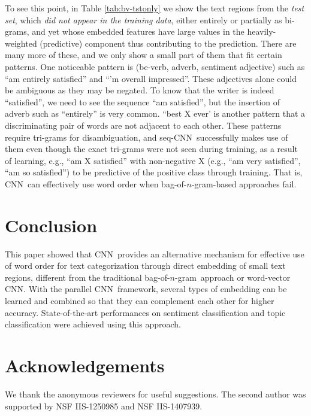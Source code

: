 \documentclass[11pt,letterpaper]{article}
\newcommand{\cnn}{CNN}
\newcommand{\scnn}{seq-CNN}
\newcommand{\bongram}{bag-of-$n$-gram}
\begin{document}
%
To see this point, in Table \ref{tab:bv-tstonly} we show the text regions from the {\em test set}, 
which {\em did not appear in the training data}, either entirely or partially as bi-grams, 
and yet whose embedded features have large values in the heavily-weighted (predictive) component 
thus contributing to the prediction.  
There are many more of these, and we only show a small part of them that fit certain patterns.  
One noticeable pattern is (be-verb, adverb, sentiment adjective) such as 
``am entirely satisfied'' and ``'m overall impressed''.  
These adjectives alone could be ambiguous as they may be negated.  To know that the 
writer is indeed ``satisfied'', we need to see the sequence ``am satisfied'', 
but the insertion of adverb such as ``entirely''  
is very common.  ``best X ever' is another pattern that a discriminating pair of words are not adjacent to 
each other.  These patterns require tri-grams for disambiguation, and 
\scnn\ successfully makes use of them even though the exact tri-grams were not seen during training, 
as a result of learning, e.g., ``am X satisfied'' with non-negative X 
(e.g., ``am very satisfied'', ``am so satisfied'') 
to be predictive of the positive class through training. 
%
That is, 
\cnn\ can effectively use word order when \bongram-based approaches fail.  

\section{Conclusion}
\label{sec:conclude}
This paper showed that \cnn\ provides an alternative mechanism for effective use of word order 
for text categorization through direct embedding of small text regions, 
different from the traditional \bongram\ approach or word-vector \cnn.  
With the parallel \cnn\ framework, several types of embedding 
can be learned and combined so that they can complement each other 
for higher accuracy.  
State-of-the-art performances on sentiment classification and topic classification were 
achieved using this approach. 

\section*{Acknowledgements}
We thank the anonymous reviewers for useful suggestions.  
The second author was supported by NSF IIS-1250985 and NSF IIS-1407939.  



\end{document}
